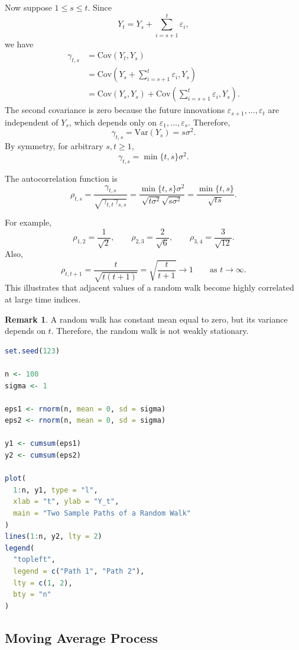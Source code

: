 \documentclass[12pt,oneside]{book}
\numberwithin{equation}{section}
\theoremstyle{definition}
\newtheorem{remark}{Remark}[section]
\theoremstyle{plain}
\theoremstyle{remark}
\newcommand{\Var}{\mathrm{Var}}
\newcommand{\Cov}{\mathrm{Cov}}
\begin{document}
Now suppose $1\leq s\leq t$. Since
\[
Y_t
=
Y_s+\sum_{i=s+1}^t \varepsilon_i,
\]
we have
\begin{align*}
\gamma_{t,s}
&=
\Cov(Y_t,Y_s) \\
&=
\Cov\left(Y_s+\sum_{i=s+1}^t\varepsilon_i,Y_s\right) \\
&=
\Cov(Y_s,Y_s)
+
\Cov\left(\sum_{i=s+1}^t\varepsilon_i,Y_s\right).
\end{align*}
The second covariance is zero because the future innovations $\varepsilon_{s+1},\ldots,\varepsilon_t$ are independent of $Y_s$, which depends only on $\varepsilon_1,\ldots,\varepsilon_s$. Therefore,
\[
\gamma_{t,s}
=
\Var(Y_s)
=
s\sigma^2.
\]
By symmetry, for arbitrary $s,t\geq 1$,
\[
\gamma_{t,s}
=
\min\{t,s\}\sigma^2.
\]

The autocorrelation function is
\[
\rho_{t,s}
=
\frac{\gamma_{t,s}}{\sqrt{\gamma_{t,t}\gamma_{s,s}}}
=
\frac{\min\{t,s\}\sigma^2}{\sqrt{t\sigma^2}\sqrt{s\sigma^2}}
=
\frac{\min\{t,s\}}{\sqrt{ts}}.
\]

For example,
\[
\rho_{1,2}
=
\frac{1}{\sqrt{2}},
\qquad
\rho_{2,3}
=
\frac{2}{\sqrt{6}},
\qquad
\rho_{3,4}
=
\frac{3}{\sqrt{12}}.
\]
Also,
\[
\rho_{t,t+1}
=
\frac{t}{\sqrt{t(t+1)}}
=
\sqrt{\frac{t}{t+1}}
\to 1
\qquad
\text{as } t\to\infty.
\]
This illustrates that adjacent values of a random walk become highly correlated at large time indices.

\begin{remark}
A random walk has constant mean equal to zero, but its variance depends on $t$. Therefore, the random walk is not weakly stationary.
\end{remark}

\begin{lstlisting}[language=R, caption={Simulating sample paths from a random walk in R}]
set.seed(123)

n <- 100
sigma <- 1

eps1 <- rnorm(n, mean = 0, sd = sigma)
eps2 <- rnorm(n, mean = 0, sd = sigma)

y1 <- cumsum(eps1)
y2 <- cumsum(eps2)

plot(
  1:n, y1, type = "l",
  xlab = "t", ylab = "Y_t",
  main = "Two Sample Paths of a Random Walk"
)
lines(1:n, y2, lty = 2)
legend(
  "topleft",
  legend = c("Path 1", "Path 2"),
  lty = c(1, 2),
  bty = "n"
)
\end{lstlisting}

\subsection*{Moving Average Process}
\end{document}
